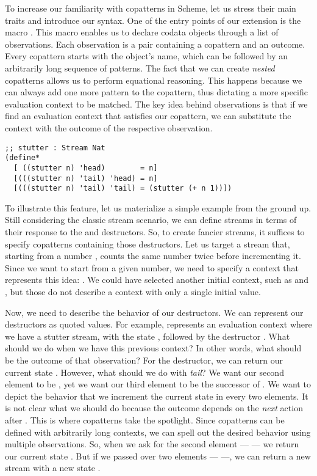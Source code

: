 To increase our familiarity with copatterns in Scheme, let us stress their main traits and introduce our syntax.
One of the entry points of our extension is the macro .
This macro enables us to declare codata objects through a list of observations.
Each observation is a pair containing a copattern and an outcome.
Every copattern starts with the object's name, which can be followed by an arbitrarily long sequence of patterns. 
The fact that we can create \emph{nested} copatterns allows us to perform equational reasoning. This happens because we can always add one more pattern to the copattern, thus dictating a more specific evaluation context to be matched. The key idea behind observations is that if we find an evaluation context that satisfies our copattern, we can substitute the context with the outcome of the respective observation.

\begin{verbatim}
;; stutter : Stream Nat
(define*
  [ ((stutter n) 'head)        = n]
  [(((stutter n) 'tail) 'head) = n]
  [(((stutter n) 'tail) 'tail) = (stutter (+ n 1))])
\end{verbatim}

To illustrate this feature, let us materialize a simple example from the ground up.
Still considering the classic stream scenario, we can define streams in terms of their response to the  and  destructors. 
So, to create fancier streams, it suffices to specify copatterns containing those destructors.
Let us target a stream that, starting from a number , counts the same number twice before incrementing it. 
Since we want to start from a given number, we need to specify a context that represents this idea: .
We could have selected another initial context, such as  and , but those do not describe a context with only a single initial value.

Now, we need to describe the behavior of our destructors.
We can represent our destructors as quoted values.
For example,  represents an evaluation context where we have a stutter stream, with the state , followed by the destructor .
What should we do when we have this previous context?
In other words, what should be the outcome of that observation? 
For the  destructor, we can return our current state .
However, what should we do with \emph{tail}? We want our second element to be , yet we want our third element to be the successor of .
We want to depict the behavior that we increment the current state in every two elements. 
It is not clear what we should do because the outcome depends on the \emph{next} action after . 
This is where copatterns take the spotlight.
Since copatterns can be defined with arbitrarily long contexts, we can spell out the desired behavior using multiple observations.
So, when we ask for the second element ---  --- we return our current state .
But if we passed over two elements ---  ---,
we can return a new stream with a new state . 

